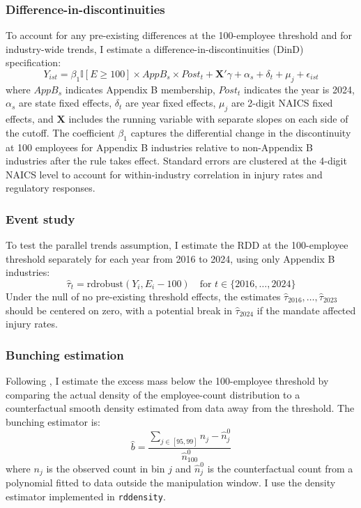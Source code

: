 \documentclass[12pt]{article}
\newcommand{\ind}{\mathbb{I}}
\begin{document}
\subsubsection*{Difference-in-discontinuities} To account for any pre-existing differences at the 100-employee threshold and for industry-wide trends, I estimate a difference-in-discontinuities (DinD) specification:
\begin{equation}\label{eq:dind}
Y_{ist} = \beta_1 \ind[E \geq 100] \times AppB_s \times Post_t + \mathbf{X}'\gamma + \alpha_s + \delta_t + \mu_j + \epsilon_{ist}
\end{equation}
where $AppB_s$ indicates Appendix B membership, $Post_t$ indicates the year is 2024, $\alpha_s$ are state fixed effects, $\delta_t$ are year fixed effects, $\mu_j$ are 2-digit NAICS fixed effects, and $\mathbf{X}$ includes the running variable with separate slopes on each side of the cutoff. The coefficient $\beta_1$ captures the differential change in the discontinuity at 100 employees for Appendix B industries relative to non-Appendix B industries after the rule takes effect. Standard errors are clustered at the 4-digit NAICS level to account for within-industry correlation in injury rates and regulatory responses.

\subsubsection*{Event study} To test the parallel trends assumption, I estimate the RDD at the 100-employee threshold separately for each year from 2016 to 2024, using only Appendix B industries:
\begin{equation}\label{eq:event}
\hat{\tau}_t = \text{rdrobust}(Y_i, E_i - 100) \quad \text{for } t \in \{2016, \ldots, 2024\}
\end{equation}
Under the null of no pre-existing threshold effects, the estimates $\hat{\tau}_{2016}, \ldots, \hat{\tau}_{2023}$ should be centered on zero, with a potential break in $\hat{\tau}_{2024}$ if the mandate affected injury rates.

\subsubsection*{Bunching estimation} Following \citet{kleven2011}, I estimate the excess mass below the 100-employee threshold by comparing the actual density of the employee-count distribution to a counterfactual smooth density estimated from data away from the threshold. The bunching estimator is:
\begin{equation}
\hat{b} = \frac{\sum_{j \in [95,99]} n_j - \hat{n}_j^0}{\hat{n}_{100}^0}
\end{equation}
where $n_j$ is the observed count in bin $j$ and $\hat{n}_j^0$ is the counterfactual count from a polynomial fitted to data outside the manipulation window. I use the \citet{cattaneo2020density} density estimator implemented in \texttt{rddensity}.
\end{document}
